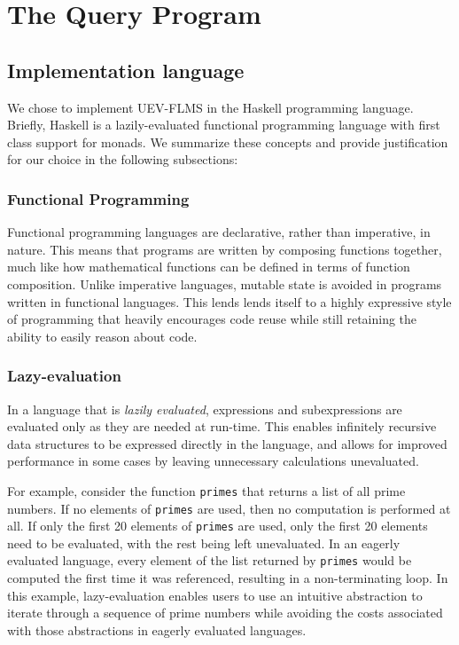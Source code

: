 \documentclass[../main.tex]{subfiles}
\begin{document}
\chapter{The Query Program}

\label{chapter:implementation}

\section{Implementation language}

We chose to implement UEV-FLMS in the Haskell programming language\cite{haskell}.
Briefly, Haskell is a lazily-evaluated functional programming language with first class support
for monads.  We summarize these concepts and provide justification for our choice in the following subsections:

\subsection{Functional Programming}

Functional programming languages are declarative, rather than imperative, in nature.
This means that programs are written by composing functions together, much like how mathematical
functions can be defined in terms of function composition.  Unlike imperative languages,
mutable state is avoided in programs written in functional languages. This lends lends itself to a highly expressive
style of programming that heavily encourages code reuse while still retaining the ability to easily reason about code.


\subsection{Lazy-evaluation}

In a language that is {\em lazily evaluated}, expressions and subexpressions are evaluated only as they are needed at run-time.  This enables infinitely recursive data structures to be expressed directly in the language, and allows for improved performance in some cases by leaving unnecessary calculations unevaluated.

For example, consider the function \texttt{primes} that returns a list of all prime numbers.
If no elements of \texttt{primes} are used, then no computation is performed at all.
If only the first 20 elements of \texttt{primes} are used, only the first 20 elements need to be evaluated,
with the rest being left unevaluated.  In an eagerly evaluated language, every element of the list returned by \texttt{primes} would be computed the first time it was referenced, resulting in a non-terminating loop.
In this example, lazy-evaluation enables users to use an intuitive abstraction to iterate through a sequence of prime numbers while avoiding the costs associated with those abstractions in eagerly evaluated languages.
\end{document}
